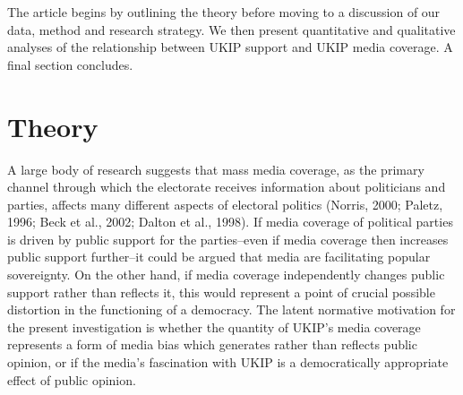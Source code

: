 \documentclass[12pt,article]{article}
\begin{document}
The article begins by outlining the theory before moving to a discussion
of our data, method and research strategy. We then present quantitative
and qualitative analyses of the relationship between UKIP support and
UKIP media coverage. A final section concludes.

\section{Theory}\label{theory}

A large body of research suggests that mass media coverage, as the
primary channel through which the electorate receives information about
politicians and parties, affects many different aspects of electoral
politics (Norris, 2000; Paletz, 1996; Beck et al., 2002; Dalton et al.,
1998). If media coverage of political parties is driven by public
support for the parties--even if media coverage then increases public
support further--it could be argued that media are facilitating popular
sovereignty. On the other hand, if media coverage independently changes
public support rather than reflects it, this would represent a point of
crucial possible distortion in the functioning of a democracy. The
latent normative motivation for the present investigation is whether the
quantity of UKIP's media coverage represents a form of media bias which
generates rather than reflects public opinion, or if the media's
fascination with UKIP is a democratically appropriate effect of public
opinion.
\end{document}
